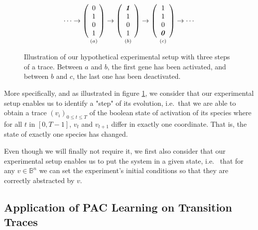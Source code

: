 \documentclass{llncs}
\begin{document}
\begin{figure}[htbp]
	{\large 
	\[
	\cdots
	\rightarrow
	\underset{\vspace{1em}(a)}{
		\left(\begin{array}{c}
		0\\ 1\\ 0\\ 1
		\end{array}\right)}
	\rightarrow
	\underset{\vspace{1em}(b)}{
		\left(\begin{array}{c}
		\textbf{\textit{1}}\\ 1\\ 0\\ 1
		\end{array}\right)}
	\rightarrow
	\underset{\vspace{1em}(c)}{
		\left(\begin{array}{c}
		1\\ 1\\ 0\\ \textbf{\textit 0}
		\end{array}\right)}
	\rightarrow
	\cdots
	\]
}
	\caption{\label{steps}Illustration of our hypothetical experimental setup with three steps of a trace. Between $a$ and $b$, the first gene has been activated, and between $b$ and $c$, the last one has been deactivated.}
\end{figure}

More specifically, and as illustrated in figure \ref{steps}, we consider that our experimental setup enables us to identify a "step" of its evolution, i.e.~that we are able to obtain a trace $(v_i)_{0 \leq t \leq T}$ of the boolean state of activation of its species where for all $t$ in $[0,T-1]$, $v_t$ and $v_{t+1}$ differ in exactly one coordinate. That is, the state of exactly one species has changed.


Even though we will finally not require it, we first also consider that our experimental setup enables us to put the system in a given state, i.e.~ that for any $v \in \mathbb{B}^n$ we can set the experiment's initial conditions so that they are correctly abstracted by $v$.

\subsection{Application of PAC Learning on Transition Traces}
\end{document}

